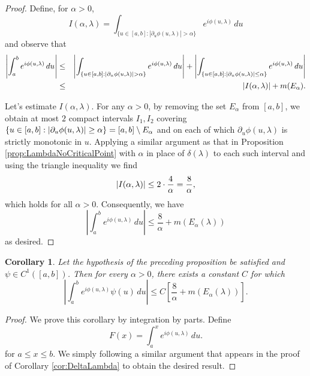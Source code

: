 \documentclass[11pt, letter]{book}
\newtheorem{corollary}[theorem]{Corollary}
\newcommand{\lb}{\left[}
\newcommand{\rb}{\right]}
\newcommand{\p}{\partial}
\newcommand{\f}[2]{\frac{#1}{#2}}
\newcommand{\al}{\alpha}
\begin{document}
\begin{proof}
Define, for $\alpha>0$,
\begin{equation*}
    I(\alpha, \lambda)=\int_{\{u\in[a,b]:|\p_u \phi(u,\lambda)|> \alpha\}}e^{i\phi(u,\lambda)}\,du
\end{equation*}
and observe that
\begin{eqnarray*}
    \abs{\int_a^b e^{i\phi(u,\lambda)} \,du}
    &\leq&  \abs{\int_{\{u\in[a,b]:|\p_u\phi(u,\lambda)|> \alpha\}}e^{i\phi(u,\lambda)}\,du}
    + 
    \abs{\int_{\{ u \in [a,b]: \abs{\p_u\phi(u,\lambda)} \leq \al \}}e^{i\phi(u,\lambda)} \,du } \\
    &\leq& \abs{I(\alpha,\lambda)}  + m(E_\al).
\end{eqnarray*}

Let's estimate $I(\al,\lambda)$. For any $\alpha>0$, by removing the set $E_\alpha$ from $[a,b]$, we obtain at most $2$ compact intervals $I_1,I_2$ covering $\{ u\in [a,b] : \abs{\p_u \phi(u,\lambda)} \geq\alpha \}=[a,b]\setminus E_\alpha$ and on each of which $\p_u\phi(u,\lambda)$ is strictly monotonic in $u$. Applying a similar argument as that in Proposition \ref{prop:LambdaNoCriticalPoint} with $\al$ in place of $\delta(\lambda)$ to each such interval and using the triangle inequality we find 
\begin{equation*}
    \abs{I(\alpha,\lambda)} \leq  2\cdot \f{4}{\al} = \f{8}{\al},
\end{equation*}
which holds for all $\alpha>0$. Consequently, we have
\begin{equation*}
\left|\int_a^b e^{i\phi(u,\lambda)}\,du\right| \leq \frac{8}{\alpha}+m(E_\alpha(\lambda))
\end{equation*}
as desired.
\end{proof}


\begin{framed}
\begin{corollary}\label{cor:LambdaPsiPhi}
Let the hypothesis of the preceding proposition be satisfied and $\psi \in C^1([a,b])$. Then for every $\al > 0$, there exists a constant $C$ for which
\begin{equation*}
\left|\int_a^b e^{i\phi(u,\lambda)}\psi(u) \,du\right| \leq  C\lb \frac{8}{\alpha}+m(E_\alpha(\lambda))\rb .
\end{equation*}
\end{corollary}
\end{framed}


\begin{proof}
We prove this corollary by integration by parts. Define
\begin{equation*}
    F(x) = \int_a^x e^{i \phi(u,\lambda)}\,du.
\end{equation*}
for $a\leq x\leq b$. We simply following a similar argument that appears in the proof of Corollary \ref{cor:DeltaLambda} to obtain the desired result.
\end{proof}
\end{document}
